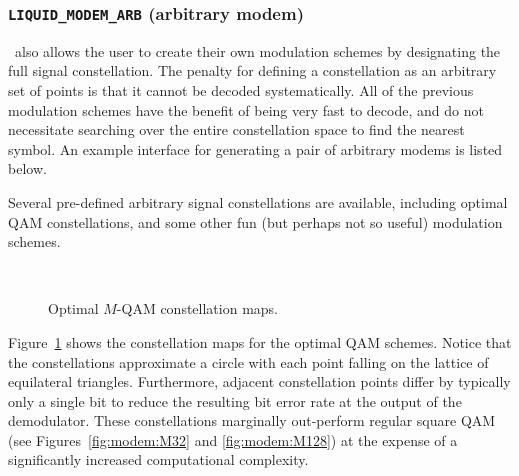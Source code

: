 \subsubsection{{\tt LIQUID\_MODEM\_ARB} (arbitrary modem)}
\label{module:modem:digital:ARB}
\liquid\ also allows the user to create their own modulation schemes by
designating the full signal constellation.
The penalty for defining a constellation as an arbitrary set of points
is that it cannot be decoded systematically.
All of the previous modulation schemes have the benefit of being very
fast to decode, and do not necessitate searching over the entire
constellation space to find the nearest symbol.
%
An example interface for generating a pair of arbitrary modems is listed
below.
%

%
Several pre-defined arbitrary signal constellations are available,
including optimal QAM constellations, and some other fun
(but perhaps not so useful) modulation schemes.
%
\begin{figure}
\centering
\mbox{
   \quad
   \quad
}
\mbox{
   \quad
   \quad
}
   \quad
\caption{Optimal $M$-QAM constellation maps.}
\label{fig:modem:optqam}
\end{figure}
%
Figure~\ref{fig:modem:optqam} shows the constellation maps for the
optimal QAM schemes.
Notice that the constellations approximate a circle with each point
falling on the lattice of equilateral triangles.
Furthermore, adjacent constellation points differ by typically only a
single bit to reduce the resulting bit error rate at the output of the
demodulator.
These constellations marginally out-perform regular square QAM
(see Figures~\ref{fig:modem:M32} and \ref{fig:modem:M128})
at the expense of a significantly increased computational complexity.

